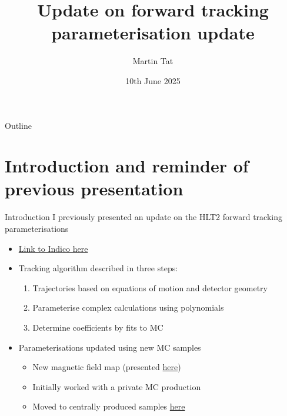 \documentclass[xcolor={dvipsnames}]{beamer}
\title[RTA WP2 meeting]{Update on forward tracking parameterisation update}
\author[Martin Tat]{Martin Tat}
\institute[Heidelberg]{Heidelberg University}
\date{10th June 2025}
\begin{document}
\begin{frame}
  \titlepage
\end{frame}

\begin{frame}{Outline}
  \tableofcontents
\end{frame}

\section{Introduction and reminder of previous presentation}

\begin{frame}{Introduction}
  \vspace{0.0cm}
  {\Large I previously presented an update on the HLT2 forward tracking parameterisations}
  \vspace{0.5cm}
  \begin{itemize}
    \setlength\itemsep{1.0em}
    \item{\href{https://indico.cern.ch/event/1541826/\#13-update-of-pattern-recogniti}{Link to Indico here}}
    \item{Tracking algorithm described in three steps:}
    \begin{enumerate}
      \item{Trajectories based on equations of motion and detector geometry}
      \item{Parameterise complex calculations using polynomials}
      \item{Determine coefficients by fits to MC}
    \end{enumerate}
    \item{Parameterisations updated using new MC samples}
    \begin{itemize}
      \item{New magnetic field map (presented \href{https://indico.cern.ch/event/1539235/\#3-update-magnetic-field-map}{here})}
      \item{Initially worked with a private MC production}
      \item{Moved to centrally produced samples \href{https://gitlab.cern.ch/lhcb-simulation/mc-requests/-/merge_requests/1208}{here}}
    \end{itemize}
  \end{itemize}
\end{frame}
\end{document}
